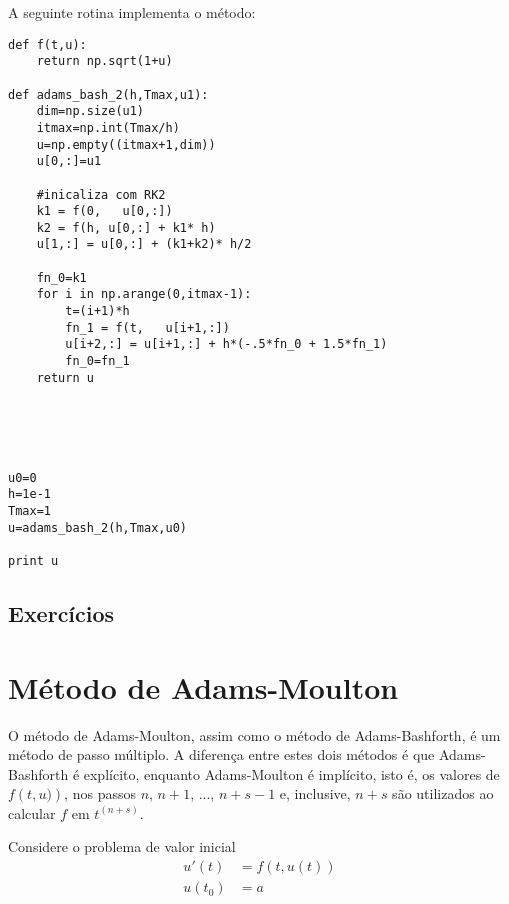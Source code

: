 \ifispython
A seguinte rotina implementa o método:
\begin{verbatim}
def f(t,u):
	return np.sqrt(1+u)

def adams_bash_2(h,Tmax,u1):
	dim=np.size(u1)
	itmax=np.int(Tmax/h)
	u=np.empty((itmax+1,dim))
	u[0,:]=u1

	#inicaliza com RK2
	k1 = f(0,   u[0,:])
	k2 = f(h, u[0,:] + k1* h)
	u[1,:] = u[0,:] + (k1+k2)* h/2

	fn_0=k1
	for i in np.arange(0,itmax-1):
		t=(i+1)*h
		fn_1 = f(t,   u[i+1,:])
		u[i+2,:] = u[i+1,:] + h*(-.5*fn_0 + 1.5*fn_1)
		fn_0=fn_1
	return u





u0=0
h=1e-1
Tmax=1
u=adams_bash_2(h,Tmax,u0)

print u
\end{verbatim}
\fi

\emconstrucao

\subsection*{Exercícios}

\emconstrucao

\section{Método de Adams-Moulton}\label{sec:Adams_Moulton}
O método de Adams-Moulton, assim como o método de Adams-Bashforth, é um método de passo múltiplo. A diferença entre estes dois métodos é que Adams-Bashforth é explícito, enquanto Adams-Moulton é implícito, isto é, os valores de $f\left(t,u)\right)$, nos passos $n$, $n+1$, ..., $n+s-1$ e, inclusive, $n+s$ são utilizados ao calcular $f$ em $t^{(n+s)}$.

Considere o problema de valor inicial
\begin{eqnarray}
  u'(t) &= f(t,u(t)) \\
  u(t_0) &= a
\end{eqnarray}


